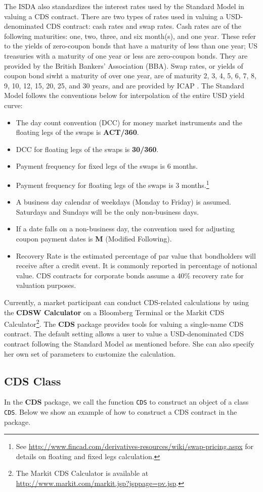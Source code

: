 \documentclass[article]{jss}
\begin{document}
The ISDA also standardizes the interest rates used by the Standard Model in valuing a CDS contract. There are two types of rates used in valuing a USD-denominated CDS contract: cash rates and swap rates. Cash rates are of the following maturities: one, two, three, and six month(s), and one year. These refer to the yields of zero-coupon bonds that have a maturity of less than one year; US treasuries with a maturity of one year or less are zero-coupon bonds. They are provided by the British Bankers' Association (BBA). Swap rates, or yields of coupon bond siwht a maturity of over one year, are of maturity 2, 3, 4, 5, 6, 7, 8, 9, 10, 12, 15, 20, 25, and 30 years, and are provided by ICAP \citep{rates}. The Standard Model follows the conventions below for interpolation of the entire USD yield curve:
\begin{itemize}
\item The day count convention (DCC) for money market instruments and
  the floating legs of the swaps is \textbf{ACT/360}.
\item DCC for floating legs of the swaps is \textbf{30/360}.
\item Payment frequency for fixed legs of the swaps is 6 months.
\item Payment frequency for floating legs of the swaps is 3
  months.\footnote{See
    \url{http://www.fincad.com/derivatives-resources/wiki/swap-pricing.aspx}
    for details on floating and fixed legs calculation.}
\item A business day calendar of weekdays (Monday to Friday) is
  assumed. Saturdays and Sundays will be the only non-business days.
\item If a date falls on a non-business day, the convention used for
  adjusting coupon payment dates is \textbf{M} (Modified Following).
\item Recovery Rate is the estimated percentage of par value that
  bondholders will receive after a credit event. It is commonly
  reported in percentage of notional value. CDS contracts for corporate bonds
  assume a 40\% recovery rate for valuation purposes. 
\end{itemize}

Currently, a market participant can conduct CDS-related calculations by using the \textbf{CDSW Calculator} on a Bloomberg Terminal or the Markit CDS Calculator\footnote{The Markit CDS Calculator is available
  at \url{http://www.markit.com/markit.jsp?jsppage=pv.jsp}.}. The \textbf{CDS} package provides tools for valuing a single-name CDS contract. The default setting allows a user to value a USD-denominated CDS contract following the Standard Model as mentioned before. She can also specify her own set of parameters to customize the calculation. 

\subsection{CDS Class}
\label{class:CDS}

In the \textbf{CDS} package, we call the function \texttt{CDS} to construct an object of a class \texttt{CDS}. Below we show an example of how to construct a CDS contract in the package.
\end{document}
